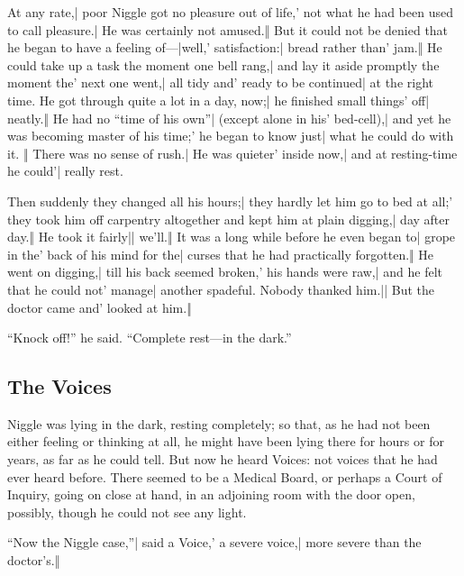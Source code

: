 
\begin{itemize}
\halfone At any rate,| poor Niggle got no pleasure out of life,' not what he had been used to call pleasure.| He was certainly not amused.‖
\halftwo But it could not be denied that he began to have a feeling of—|well,' satisfaction:| bread rather than' jam.‖ He could take up a task the moment one bell rang,| and lay it aside promptly the moment the' next one went,| all tidy and' ready to be continued| at the right time.
\halfone He got through quite a lot in a day, now;| he finished small things' off| neatly.‖ He had no “time of his own”| (except alone in his' bed-cell),| and yet he was becoming master of his time;' he began to know just| what he could do with it.
\quarterfour ‖ There was no sense of rush.| He was quieter' inside now,| and at resting-time he could'| really rest.
\end{itemize}

\begin{itemize}
\halfone Then suddenly they changed all his hours;| they hardly let him go to bed at all;' they took him off carpentry altogether and kept him at plain digging,| day after day.‖
\halftwo He took it fairly|| we'll.‖
\halfone It was a long while before he even began to| grope in the' back of his mind for the| curses that he had practically forgotten.‖ He went on digging,| till his back seemed broken,' his hands were raw,| and he felt that he could not' manage| another spadeful.
\halftwo Nobody thanked him.|| But the doctor came and' looked at him.‖
\end{itemize}

“Knock off!” he said. “Complete rest—in the dark.”

\subsection*{The Voices}

Niggle was lying in the dark, resting completely; so that, as he had not been either feeling or thinking at all, he might have been lying there for hours or for years, as far as he could tell. But now he heard Voices: not voices that he had ever heard before. There seemed to be a Medical Board, or perhaps a Court of Inquiry, going on close at hand, in an adjoining room with the door open, possibly, though he could not see any light.


\begin{itemize}
\halfone “Now the Niggle case,”| said a Voice,' a severe voice,| more severe than the doctor’s.‖
\end{itemize}

